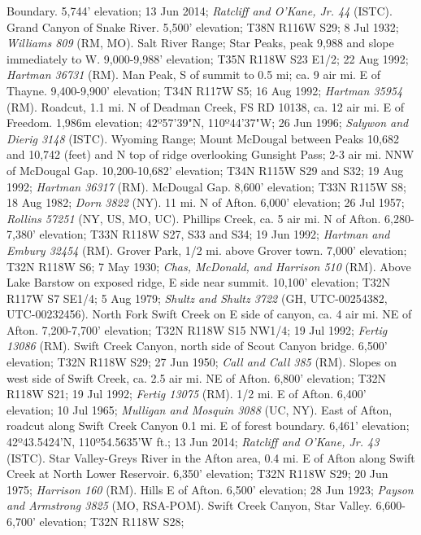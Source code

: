 Boundary. 5,744' elevation; 13 Jun 2014;
\textit{Ratcliff and O'Kane, Jr. 44} (ISTC).
Grand Canyon of Snake River. 5,500' elevation; T38N R116W S29; 8 Jul 1932;
\textit{Williams 809} (RM, MO).
Salt River Range; Star Peaks, peak 9,988 and slope immediately to W.
9,000-9,988' elevation; T35N R118W S23 E1/2; 22 Aug 1992;
\textit{Hartman 36731} (RM).
Man Peak, S of summit to 0.5 mi; ca. 9 air mi. E of Thayne.
9,400-9,900' elevation; T34N R117W S5; 16 Aug 1992; \textit{Hartman 35954} (RM).
Roadcut, 1.1 mi. N of Deadman Creek, FS RD 10138, ca. 12 air mi. E of Freedom.
1,986m elevation; 42º57'39"N, 110º44'37"W; 26 Jun 1996;
\textit{Salywon and Dierig 3148} (ISTC).
Wyoming Range; Mount McDougal between Peaks 10,682 and 10,742 (feet) and N top of
ridge overlooking Gunsight Pass; 2-3 air mi. NNW of McDougal Gap. 10,200-10,682'
elevation; T34N R115W S29 and S32; 19 Aug 1992; \textit{Hartman 36317} (RM).
McDougal Gap. 8,600' elevation; T33N R115W S8; 18 Aug 1982;
\textit{Dorn 3822} (NY).
11 mi. N of Afton. 6,000' elevation; 26 Jul 1957;
\textit{Rollins 57251} (NY, US, MO, UC).
Phillips Creek, ca. 5 air mi. N of Afton. 6,280-7,380' elevation;
T33N R118W S27, S33 and S34; 19 Jun 1992;
\textit{Hartman and Embury 32454} (RM).
Grover Park, 1/2 mi. above Grover town. 7,000' elevation; T32N R118W S6;
7 May 1930; \textit{Chas, McDonald, and Harrison 510} (RM).
Above Lake Barstow on exposed ridge, E side near summit.
10,100' elevation; T32N R117W S7 SE1/4; 5 Aug 1979;
\textit{Shultz and Shultz 3722} (GH, UTC-00254382, UTC-00232456).
North Fork Swift Creek on E side of canyon, ca. 4 air mi. NE of Afton.
7,200-7,700' elevation; T32N R118W S15 NW1/4; 19 Jul 1992;
\textit{Fertig 13086} (RM).
Swift Creek Canyon, north side of Scout Canyon bridge.
6,500' elevation; T32N R118W S29; 27 Jun 1950; \textit{Call and Call 385} (RM).
Slopes on west side of Swift Creek, ca. 2.5 air mi. NE of Afton.
6,800' elevation; T32N R118W S21; 19 Jul 1992; \textit{Fertig 13075} (RM).
1/2 mi. E of Afton. 6,400' elevation; 10 Jul 1965;
\textit{Mulligan and Mosquin 3088} (UC, NY).
East of Afton, roadcut along Swift Creek Canyon 0.1 mi. E of forest boundary.
6,461' elevation; 42º43.5424'N, 110º54.5635'W  ft.;
13 Jun 2014; \textit{Ratcliff and O'Kane, Jr. 43} (ISTC).
Star Valley-Greys River in the Afton area, 0.4 mi. E of Afton along Swift Creek
at North Lower Reservoir. 6,350' elevation; T32N R118W S29; 20 Jun 1975;
\textit{Harrison 160} (RM).
Hills E of Afton. 6,500' elevation; 28 Jun 1923;
\textit{Payson and Armstrong 3825} (MO, RSA-POM).
Swift Creek Canyon, Star Valley. 6,600-6,700' elevation; T32N R118W S28;
